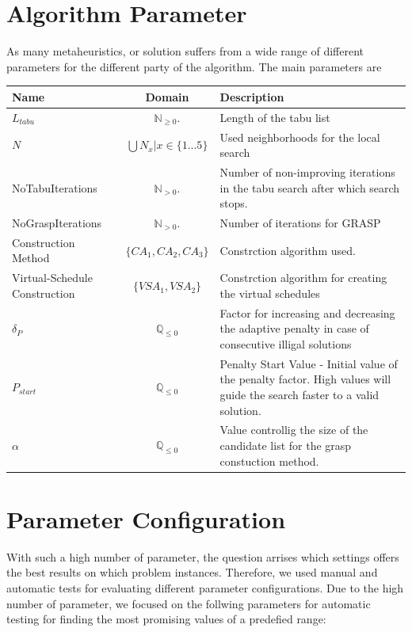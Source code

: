 \documentclass[a4paper,11pt]{article}
\begin{document}
\section{Algorithm Parameter}
As many metaheuristics, or solution suffers from a wide range of different parameters for the different party of the algorithm.
The main parameters are
\begin{center}
\begin{tabularx}{\linewidth}{| X | c | X | }
  \hline                       
  Name & Domain & Description \\   \hline     \hline    
  $L_{tabu}$ & $\mathbb{N}_{\geq0}.$ & Length of the tabu list \\ \hline    
  $N$ & $\bigcup N_x  | x \in \{1...5\}$ & Used neighborhoods for the local search \\ \hline   
  NoTabuIterations &  $\mathbb{N}_{ > 0}.$ & Number of non-improving iterations in the tabu search after which search stops. \\ \hline  
  NoGraspIterations &  $\mathbb{N}_{> 0}.$ & Number of iterations for \ac{GRASP} \\ \hline 
  Construction Method &  $\{CA_1, CA_2, CA_3\}$ & Constrction algorithm used.\\ \hline 
  Virtual-Schedule Construction &  $\{VSA_1, VSA_2\}$ & Constrction algorithm for creating the virtual schedules\\ \hline 
  $ \delta_P $ &  $\mathbb{Q}_{\leq0}$ & Factor for increasing and decreasing the adaptive penalty in case of consecutive illigal solutions\\ \hline 
  $P_{start}$ &  $\mathbb{Q}_{\leq0}$ &Penalty Start Value -  Initial value of the penalty factor. High values will guide the search faster to a valid solution.\\ \hline    
  $\alpha$ & $\mathbb{Q}_{\leq0}$ & Value controllig the size of the candidate list for the grasp constuction method. \\ \hline    
  \hline  
\end{tabularx}
\end{center}

\section{Parameter Configuration}
With such a high number of parameter, the question arrises which settings offers the best results on which problem instances. Therefore, we used manual and 
automatic tests for evaluating different parameter configurations.
Due to the high number of parameter, we focused on the follwing parameters for automatic testing for finding the most promising values of a predefied range:
\end{document}

